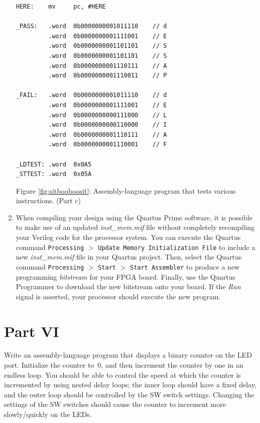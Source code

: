 \documentclass[epsfig,10pt,fullpage]{article} \addtolength{\textwidth}{1.5in}
\begin{document}
\begin{enumerate}
\begin{center}
\begin{minipage}[t]{14 cm}
\begin{lstlisting}[name=proc]
HERE:    mv     pc, #HERE

_PASS:   .word  0b0000000001011110    // d
         .word  0b0000000001111001    // E
         .word  0b0000000001101101    // S
         .word  0b0000000001101101    // S
         .word  0b0000000001110111    // A
         .word  0b0000000001110011    // P

_FAIL:   .word  0b0000000001011110    // d
         .word  0b0000000001111001    // E
         .word  0b0000000000111000    // L
         .word  0b0000000000110000    // I
         .word  0b0000000001110111    // A
         .word  0b0000000001110001    // F

_LDTEST: .word  0x0A5
_STTEST: .word  0x05A
\end{lstlisting}
\end{minipage}
\end{center}

\begin{center}
Figure \ref{fig:sitbooboosit}: Assembly-language program that tests various instructions. (Part $c$)
\end{center}

\item
When compiling your design using the Quartus Prime software, it is possible to make use of
an updated {\it inst\_mem.mif} file without completely recompiling your Verilog code for the 
processor system. You can execute the Quartus command 
\texttt{Processing} $>$ \texttt{Update Memory Initialization File} to include a 
new {\it inst\_mem.mif} file in your Quartus project. Then, select the Quartus 
command \texttt{Processing} $>$ \texttt{Start} $>$ \texttt{Start Assembler} to produce a new 
programming {\it bitstream} for your FPGA board. Finally, use 
the Quartus Programmer to 
download the new bitstream onto your board. If the {\it Run} signal is asserted, your
processor should execute the new program.

\end{enumerate}

\lstset{language=ASM,numbers=none,escapechar=|}
\section*{Part VI}
Write an assembly-language program that displays a binary counter on the LED port. Initialize 
the counter to~0, and then increment the counter by one in an endless loop. You should be
able to control the speed at which the counter is incremented by using nested delay loops;
the inner loop should have a fixed delay, and the outer loop should be controlled by the 
SW switch settings.  Changing the settings of the SW switches should cause the counter 
to increment more slowly/quickly on the LEDs. 
\end{document}
